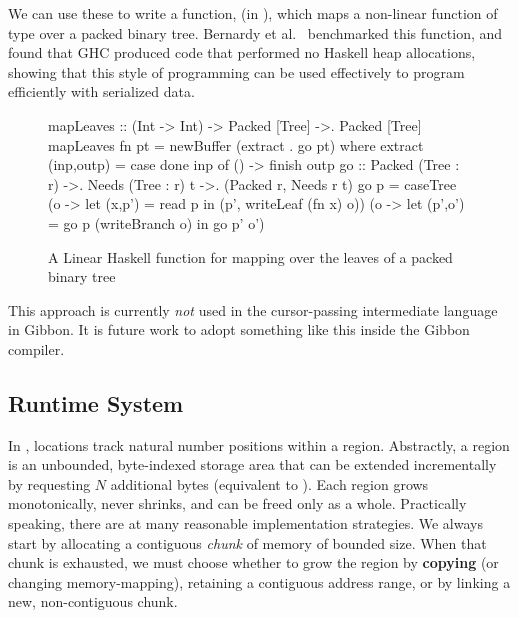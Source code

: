 We can use these to write a function,  (in ),
which maps a non-linear function of type  over a packed
binary tree. Bernardy et al.~\cite{linear-haskell} benchmarked this function,
and found that GHC produced code that performed no Haskell heap allocations,
showing that this style of programming can be used effectively to program
efficiently with serialized data.

\begin{figure}
\begin{code}
mapLeaves :: (Int -> Int) -> Packed [Tree] ->. Packed [Tree]
mapLeaves fn pt = newBuffer (extract . go pt)
  where
    extract (inp,outp) = case done inp of () -> finish outp
    go :: Packed (Tree : r) ->. Needs (Tree : r) t ->.
          (Packed r, Needs r t)
    go p = caseTree (\p o -> let (x,p') = read p
                             in (p', writeLeaf (fn x) o))
                    (\p o -> let (p',o') = go p (writeBranch o)
                             in go p' o')
\end{code}
\caption{A Linear Haskell function for mapping over the leaves of a packed
  binary tree}
\label{fig:linsumleaves}
\end{figure}

This approach is currently \emph{not} used in the cursor-passing intermediate language
in Gibbon. It is future work to adopt something like this inside the Gibbon compiler.

\subsection{Runtime System}\label{subsec:rts}

In \ourcalc, locations track natural number positions within a region.
Abstractly, a region is an unbounded, byte-indexed storage area that can be
extended incrementally by requesting $N$ additional bytes (equivalent to
).
%
Each region grows monotonically, never shrinks, and can be
freed only as a whole.
%
Practically speaking, there are at many reasonable implementation strategies.
%
We always start by allocating a contiguous {\em chunk} of memory of bounded
size.  When that chunk is exhausted, we must choose whether to grow the
region by {\bf copying} (or changing memory-mapping), retaining a contiguous
address range, or by linking a new, non-contiguous chunk.



